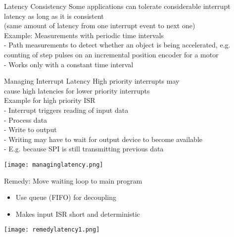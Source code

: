 \begin{minipage}{0.6\linewidth}
\begin{definition}{Latency Consistency}
    Some applications can tolerate considerable interrupt latency as long as it is consistent\\
(same amount of latency from one interrupt event to next one)
\vspace{1mm}\\
Example: Measurements with periodic time intervals\\
- Path measurements to detect whether an object is being accelerated, e.g. counting of step pulses on an incremental position encoder for a motor\\
- Works only with a constant time interval
\end{definition}

\begin{concept}{Managing Interrupt Latency}
    High priority interrupts may \\cause high latencies for lower priority interrupts
    \vspace{1mm}\\
\small
Example for high priority ISR\\
- Interrupt triggers reading of input data\\
- Process data\\
- Write to output\\
- Writing may have to wait for output device to become available\\
- E.g. because SPI is still transmitting previous data
\end{concept}
\end{minipage}
\begin{minipage}{0.4\linewidth}
\texttt{[image: managinglatency.png]}
\end{minipage}

\begin{theorem}{Remedy: Move waiting loop to main program}
    \begin{itemize}
        \item Use queue (FIFO) for decoupling
        \item Makes input ISR short and deterministic
    \end{itemize}
    \texttt{[image: remedylatency1.png]}
    
\end{theorem}

